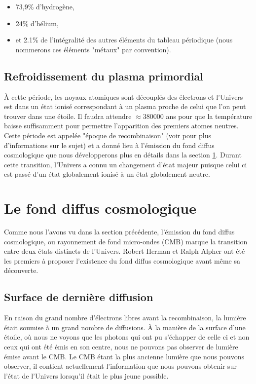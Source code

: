 \begin{itemize}
\item 73,9\% d’hydrogène,
\item 24\% d’hélium,
\item et 2.1\% de l'intégralité des autres éléments du tableau périodique  (nous nommerons ces éléments "métaux" par convention).
\end{itemize}

\subsection{Refroidissement du plasma primordial}
À cette période, les noyaux atomiques sont découplés des électrons et l'Univers est dans un état ionisé correspondant à un plasma proche de celui que l'on peut trouver dans une étoile.
Il faudra attendre $\approx 380 000$ ans pour que la température baisse suffisamment pour permettre l'apparition des premiers atomes neutres.
Cette période est appelée "époque de recombinaison" (voir \cite{2009AN....330..657S} pour plus d'informations sur le sujet) et a donné lieu à l'émission du fond diffus cosmologique que nous développerons plus en détails dans la section \ref{sec:CMB}.
Durant cette transition, l'Univers a connu un changement d'état majeur puisque celui ci est passé d'un état globalement ionisé à un état globalement neutre.

\section{Le fond diffus cosmologique}
\label{sec:CMB}

Comme nous l'avons vu dans la section précédente, l’émission du fond diffus cosmologique, ou rayonnement de fond micro-ondes (\ac{CMB}) marque la transition entre deux états distincts de l'Univers.
Robert Herman et Ralph Alpher ont été les premiers à proposer l’existence du fond diffus cosmologique avant même sa découverte.

\subsection{Surface de dernière diffusion}

En raison du grand nombre d'électrons libres avant la recombinaison, la lumière était soumise à un grand nombre de diffusions.
À la manière de la surface d'une étoile, où nous ne voyons que les photons qui ont pu s’échapper de celle ci et non ceux qui ont été émis en son centre, nous ne pouvons pas observer de lumière émise avant le \ac{CMB}.
Le \ac{CMB} étant la plus ancienne lumière que nous pouvons observer, il contient actuellement l'information que nous pouvons obtenir sur l'état de l'Univers lorsqu'il était le plus jeune possible.

